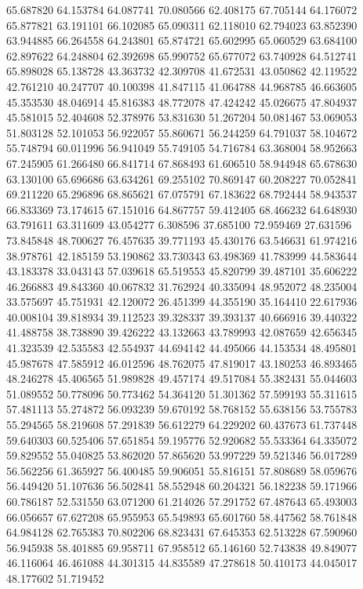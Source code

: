 65.687820
64.153784
64.087741
70.080566
62.408175
67.705144
64.176072
65.877821
63.191101
66.102085
65.090311
62.118010
62.794023
63.852390
63.944885
66.264558
64.243801
65.874721
65.602995
65.060529
63.684100
62.897622
64.248804
62.392698
65.990752
65.677072
63.740928
64.512741
65.898028
65.138728
43.363732
42.309708
41.672531
43.050862
42.119522
42.761210
40.247707
40.100398
41.847115
41.064788
44.968785
46.663605
45.353530
48.046914
45.816383
48.772078
47.424242
45.026675
47.804937
45.581015
52.404608
52.378976
53.831630
51.267204
50.081467
53.069053
51.803128
52.101053
56.922057
55.860671
56.244259
64.791037
58.104672
55.748794
60.011996
56.941049
55.749105
54.716784
63.368004
58.952663
67.245905
61.266480
66.841714
67.868493
61.606510
58.944948
65.678630
63.130100
65.696686
63.634261
69.255102
70.869147
60.208227
70.052841
69.211220
65.296896
68.865621
67.075791
67.183622
68.792444
58.943537
66.833369
73.174615
67.151016
64.867757
59.412405
68.466232
64.648930
63.791611
63.311609
43.054277
6.308596
37.685100
72.959469
27.631596
73.845848
48.700627
76.457635
39.771193
45.430176
63.546631
61.974216
38.978761
42.185159
53.190862
33.730343
63.498369
41.783999
44.583644
43.183378
33.043143
57.039618
65.519553
45.820799
39.487101
35.606222
46.266883
49.843360
40.067832
31.762924
40.335094
48.952072
48.235004
33.575697
45.751931
42.120072
26.451399
44.355190
35.164410
22.617936
40.008104
39.818934
39.112523
39.328337
39.393137
40.666916
39.440322
41.488758
38.738890
39.426222
43.132663
43.789993
42.087659
42.656345
41.323539
42.535583
42.554937
44.694142
44.495066
44.153534
48.495801
45.987678
47.585912
46.012596
48.762075
47.819017
43.180253
46.893465
48.246278
45.406565
51.989828
49.457174
49.517084
55.382431
55.044603
51.089552
50.778096
50.773462
54.364120
51.301362
57.599193
55.311615
57.481113
55.274872
56.093239
59.670192
58.768152
55.638156
53.755783
55.294565
58.219608
57.291839
56.612279
64.229202
60.437673
61.737448
59.640303
60.525406
57.651854
59.195776
52.920682
55.533364
64.335072
59.829552
55.040825
53.862020
57.865620
53.997229
59.521346
56.017289
56.562256
61.365927
56.400485
59.906051
55.816151
57.808689
58.059676
56.449420
51.107636
56.502841
58.552948
60.204321
56.182238
59.171966
60.786187
52.531550
63.071200
61.214026
57.291752
67.487643
65.493003
66.056657
67.627208
65.955953
65.549893
65.601760
58.447562
58.761848
64.984128
62.765383
70.802206
68.823431
67.645353
62.513228
67.590960
56.945938
58.401885
69.958711
67.958512
65.146160
52.743838
49.849077
46.116064
46.461088
44.301315
44.835589
47.278618
50.410173
44.045017
48.177602
51.719452
